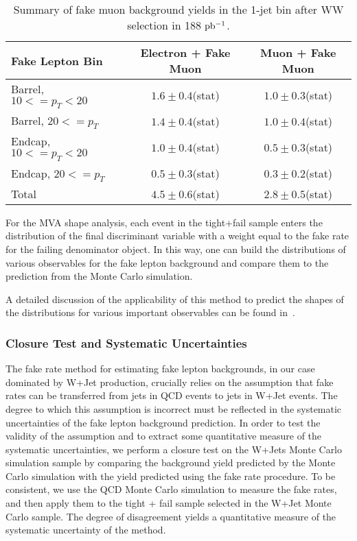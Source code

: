 \begin{table}[!htbp]
\begin{center}
\begin{tabular}{|l|c|c|}
\hline
Fake Lepton Bin               & Electron + Fake Muon & Muon + Fake Muon  \\
\hline
Barrel, $10 <= p_{T} < 20$    &  $1.6 \pm 0.4$(stat)	 &   $1.0 \pm 0.3$(stat) \\
Barrel, $20 <= p_{T} $        &  $1.4 \pm 0.4$(stat)	 &   $1.0 \pm 0.4$(stat) \\
Endcap, $10 <= p_{T} < 20$    &  $1.0 \pm 0.4$(stat)	 &   $0.5 \pm 0.3$(stat) \\
Endcap, $20 <= p_{T} $        &  $0.5 \pm 0.3$(stat)	 &   $0.3 \pm 0.2$(stat) \\
\hline
Total                         &  $4.5 \pm 0.6$(stat)     &   $2.8 \pm 0.5$(stat) \\
\hline
\end{tabular}
\caption{Summary of fake muon background yields in the 1-jet bin after WW selection in 188 $\mathrm{pb^{-1}}$.}
\label{tab:FakeMuonBkgPrediction_WWSelection_1JetBin}
\end{center}
\end{table}


For the MVA shape analysis, each event in the tight+fail sample enters the 
distribution of the final discriminant variable with a weight equal to the 
fake rate for the failing denominator object. In this way, one can build
the distributions of various observables for the fake lepton background
and compare them to the prediction from the Monte Carlo simulation. 

A detailed  discussion of the applicability of this method to predict the shapes of 
the distributions for various important observables can be found in~\cite{HWWAnalysis_Alpha}.

\subsubsection{Closure Test and Systematic Uncertainties}
\label{sec:fakerateSystematics}

The fake rate method for estimating fake lepton backgrounds, in our case
dominated by W+Jet production, crucially relies on the assumption that
fake rates can be transferred from jets in QCD events to jets in W+Jet
events. The degree to which this assumption is incorrect must be 
reflected in the systematic uncertainties of the fake lepton 
background prediction. In order to test the validity of the assumption
and to extract some quantitative measure of the systematic uncertainties,
we perform a closure test on the W+Jets Monte Carlo simulation sample by 
comparing the background yield predicted by the Monte Carlo simulation
with the yield predicted using the fake rate procedure. To be consistent,
we use the QCD Monte Carlo simulation to measure the fake rates, and then
apply them to the tight + fail sample selected in the W+Jet Monte Carlo
sample. The degree of disagreement yields a quantitative measure of the 
systematic uncertainty of the method. 

